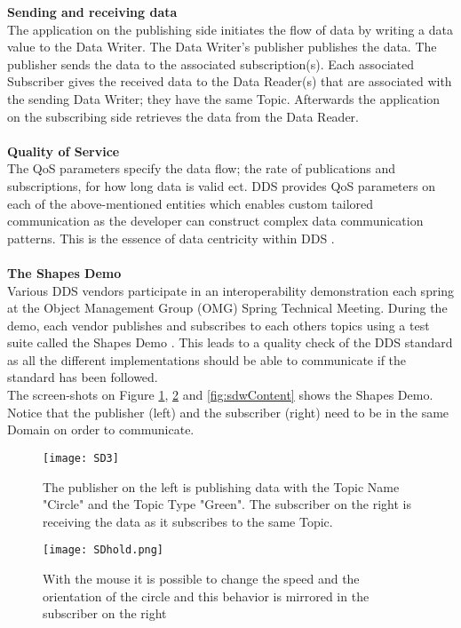 \documentclass[Main]{subfiles}
\begin{document}
\textbf{Sending and receiving data}
\\
The application on the publishing side initiates the flow of data by writing a data value to the Data Writer. 
The Data Writer's publisher publishes the data. 
The publisher sends the data to the associated subscription(s). 
Each associated Subscriber gives the received data to the Data Reader(s) that are associated with the sending Data Writer; they have the same Topic. 
Afterwards the application on the subscribing side retrieves the data from the Data Reader.
\\
\\
\textbf{Quality of Service}
\\
The QoS parameters specify the data flow; the rate of publications and subscriptions, for how long data is valid ect. 
DDS provides QoS parameters on each of the above-mentioned entities which enables custom tailored communication as the developer can construct complex data communication patterns. 
This is the essence of data centricity within DDS \cite{RTI} \cite{DDS-slides}.
\\
\\
\textbf{The Shapes Demo}
\\
Various DDS vendors participate in an interoperability demonstration each spring at the Object Management Group (OMG) Spring Technical Meeting. 
During the demo, each vendor publishes and subscribes to each others topics using a test suite called the Shapes Demo \cite{wiki-DDS}. 
This leads to a quality check of the DDS standard as all the different implementations should be able to communicate if the standard has been followed.
\\
The screen-shots on Figure \ref{fig:sd3}, \ref{fig:sdhold} and \ref{fig:sdwContent} shows the Shapes Demo. 
Notice that the publisher (left) and the subscriber (right) need to be in the same Domain on order to communicate.

\begin{figure}[H]
\centering
\texttt{[image: SD3]}
\caption{The publisher on the left is publishing data with the Topic Name "Circle" and the Topic Type "Green". The subscriber on the right is receiving the data as it subscribes to the same Topic.}
\label{fig:sd3}
\end{figure}



\begin{figure}[H]
\centering
\texttt{[image: SDhold.png]}
\caption{With the mouse it is possible to change the speed and the orientation of the circle and this behavior is mirrored in the subscriber on the right}
\label{fig:sdhold}
\end{figure}
\end{document}
